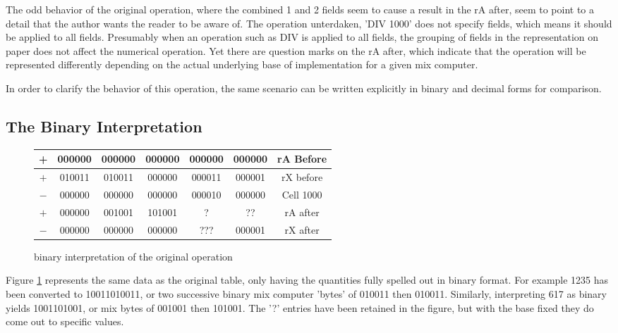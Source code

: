 \documentclass{article}
\begin{document}
The odd behavior of the original operation, where the combined
1 and 2 fields seem to cause a result in the rA after, seem
to point to a detail that the author wants the reader to be
aware of.  The operation unterdaken, 'DIV 1000' does not
specify fields, which means it should be applied to all fields.
Presumably when an operation such as DIV is applied to all
fields, the grouping of fields in the representation on paper
does not affect the numerical operation.  Yet there are question
marks on the rA after, which indicate that the operation will
be represented differently depending on the actual underlying
base of implementation for a given mix computer.

In order to clarify the behavior of this operation, the
same scenario can be written explicitly in binary and decimal
forms for comparison.

\subsection*{The Binary Interpretation}

\begin{figure}
    \begin{center}
        \begin{tabular}{|c|c|c|c|c|c|c|}
            \hline
            + & 000000 & 000000 & 000000 & 000000 & 000000 & rA Before \\
            \hline
            $+$ & 010011 & 010011 & 000000 & 000011 & 000001 & rX before \\
            \hline
            $-$ & 000000 & 000000 & 000000 & 000010 & 000000 & Cell 1000 \\
            \hline
            $+$ & 000000 & 001001 & 101001 & ? & ?? & rA after \\
            \hline
            $-$ & 000000 & 000000 & 000000 & ??? & 000001 & rX after \\
            \hline
        \end{tabular}
    \end{center}
    \caption{binary interpretation of the original operation}
    \label{fig:binquestion}
\end{figure}

Figure \ref{fig:binquestion} represents the same data as the
original table, only having the quantities fully spelled out
in binary format.  For example 1235 has been converted to
10011010011, or two successive binary
mix computer 'bytes' of 010011 then 010011.  Similarly, interpreting 617
as binary yields 1001101001, or mix bytes of 001001 then 101001. The
'?' entries have been retained in the figure, but with the base
fixed they do come out to specific values.
\end{document}
